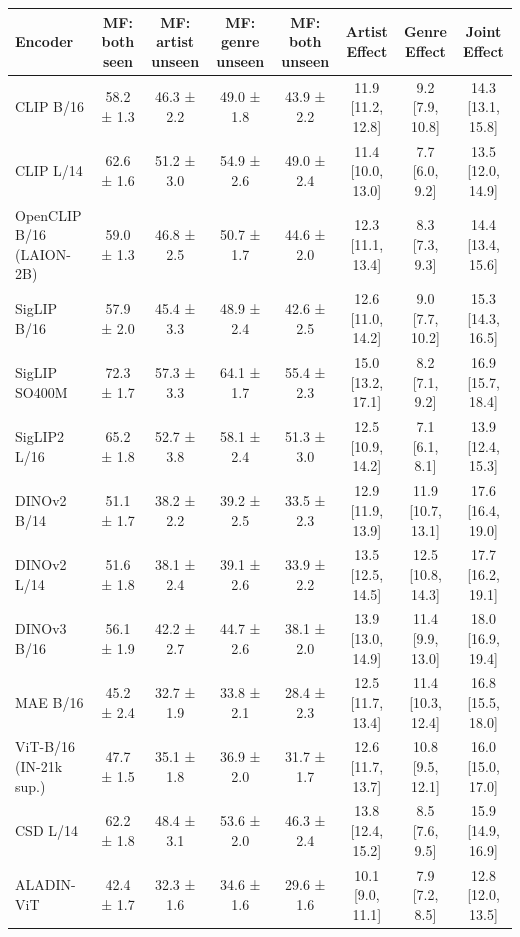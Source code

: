 \begin{tabular}{lccccccc}
\toprule
Encoder & MF: both seen & MF: artist unseen & MF: genre unseen & MF: both unseen & Artist Effect & Genre Effect & Joint Effect \\
\midrule
CLIP B/16 & 58.2 ± 1.3 & 46.3 ± 2.2 & 49.0 ± 1.8 & 43.9 ± 2.2 & 11.9 [11.2, 12.8] & 9.2 [7.9, 10.8] & 14.3 [13.1, 15.8] \\
CLIP L/14 & 62.6 ± 1.6 & 51.2 ± 3.0 & 54.9 ± 2.6 & 49.0 ± 2.4 & 11.4 [10.0, 13.0] & 7.7 [6.0, 9.2] & 13.5 [12.0, 14.9] \\
OpenCLIP B/16 (LAION-2B) & 59.0 ± 1.3 & 46.8 ± 2.5 & 50.7 ± 1.7 & 44.6 ± 2.0 & 12.3 [11.1, 13.4] & 8.3 [7.3, 9.3] & 14.4 [13.4, 15.6] \\
SigLIP B/16 & 57.9 ± 2.0 & 45.4 ± 3.3 & 48.9 ± 2.4 & 42.6 ± 2.5 & 12.6 [11.0, 14.2] & 9.0 [7.7, 10.2] & 15.3 [14.3, 16.5] \\
SigLIP SO400M & 72.3 ± 1.7 & 57.3 ± 3.3 & 64.1 ± 1.7 & 55.4 ± 2.3 & 15.0 [13.2, 17.1] & 8.2 [7.1, 9.2] & 16.9 [15.7, 18.4] \\
SigLIP2 L/16 & 65.2 ± 1.8 & 52.7 ± 3.8 & 58.1 ± 2.4 & 51.3 ± 3.0 & 12.5 [10.9, 14.2] & 7.1 [6.1, 8.1] & 13.9 [12.4, 15.3] \\
DINOv2 B/14 & 51.1 ± 1.7 & 38.2 ± 2.2 & 39.2 ± 2.5 & 33.5 ± 2.3 & 12.9 [11.9, 13.9] & 11.9 [10.7, 13.1] & 17.6 [16.4, 19.0] \\
DINOv2 L/14 & 51.6 ± 1.8 & 38.1 ± 2.4 & 39.1 ± 2.6 & 33.9 ± 2.2 & 13.5 [12.5, 14.5] & 12.5 [10.8, 14.3] & 17.7 [16.2, 19.1] \\
DINOv3 B/16 & 56.1 ± 1.9 & 42.2 ± 2.7 & 44.7 ± 2.6 & 38.1 ± 2.0 & 13.9 [13.0, 14.9] & 11.4 [9.9, 13.0] & 18.0 [16.9, 19.4] \\
MAE B/16 & 45.2 ± 2.4 & 32.7 ± 1.9 & 33.8 ± 2.1 & 28.4 ± 2.3 & 12.5 [11.7, 13.4] & 11.4 [10.3, 12.4] & 16.8 [15.5, 18.0] \\
ViT-B/16 (IN-21k sup.) & 47.7 ± 1.5 & 35.1 ± 1.8 & 36.9 ± 2.0 & 31.7 ± 1.7 & 12.6 [11.7, 13.7] & 10.8 [9.5, 12.1] & 16.0 [15.0, 17.0] \\
CSD L/14 & 62.2 ± 1.8 & 48.4 ± 3.1 & 53.6 ± 2.0 & 46.3 ± 2.4 & 13.8 [12.4, 15.2] & 8.5 [7.6, 9.5] & 15.9 [14.9, 16.9] \\
ALADIN-ViT & 42.4 ± 1.7 & 32.3 ± 1.6 & 34.6 ± 1.6 & 29.6 ± 1.6 & 10.1 [9.0, 11.1] & 7.9 [7.2, 8.5] & 12.8 [12.0, 13.5] \\
\bottomrule
\end{tabular}
